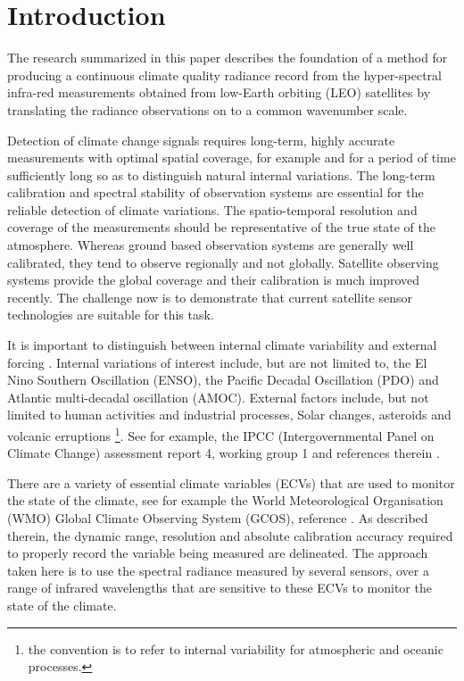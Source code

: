 \documentclass[twocolumn,10pt]{article}
\begin{document}
\section{Introduction}
\label{sec:orgheadline2}

The research summarized in this paper describes the foundation of a method for producing a continuous climate quality radiance record from the hyper-spectral infra-red measurements obtained from low-Earth orbiting (LEO) satellites by translating the radiance observations on to a common wavenumber scale.

Detection of climate change signals requires long-term, highly accurate measurements with optimal spatial coverage, for example \cite{wielicki2013} and for a period of time sufficiently long so as to distinguish natural internal variations. The long-term calibration and spectral stability of observation systems are essential for the reliable detection of climate variations. The spatio-temporal resolution and coverage of the measurements should be representative of the true state of the atmosphere. Whereas ground based observation systems are generally well calibrated, they tend to observe regionally and not globally. Satellite observing systems provide the global coverage and their calibration is much improved recently. The challenge now is to demonstrate that current satellite sensor technologies are suitable for this task.

It is important to distinguish between internal climate variability and external forcing \cite{solomon2010}. Internal variations of interest include, but are not limited to, the El Nino Southern Oscillation (ENSO), the Pacific Decadal Oscillation (PDO) and Atlantic multi-decadal oscillation (AMOC). External factors include, but not limited to human activities and industrial processes, Solar changes, asteroids and volcanic erruptions \footnote{the convention is to refer to internal variability for atmospheric and oceanic processes. }. See for example, the IPCC (Intergovernmental Panel on Climate Change) assessment report 4, working group 1 and references therein \cite{ipcc2007_wg1}. 

There are a variety of essential climate variables (ECVs) that are used to monitor the state of the climate, see for example the World Meteorological Organisation (WMO) Global Climate Observing System (GCOS), reference \cite{gcos}. As described therein, the dynamic range, resolution and absolute calibration accuracy required to properly record the variable being measured are delineated. The approach taken here is to use the spectral radiance measured by several sensors, over a range of infrared wavelengths that are sensitive to these ECVs to monitor the state of the climate.
\end{document}
